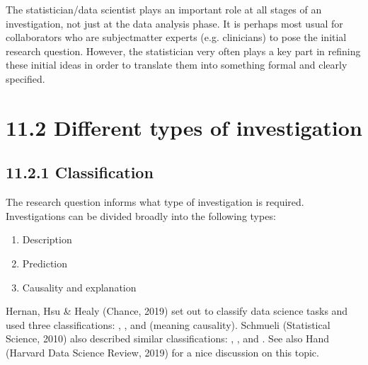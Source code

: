 \documentclass[letterpaper,10pt,english]{jupyterBook}
\let\sphinxpxdimen\pdfpxdimen\else\newdimen\sphinxpxdimen
\begin{document}
\begin{figure}[htbp]
\centering

\noindent\sphinxincludegraphics[height=400\sphinxpxdimen]{{01_intro_PPDAC_adapt}.png}
\end{figure}

\sphinxAtStartPar
The statistician/data scientist plays an important role at all stages of an investigation, not just at
the data analysis phase. It is perhaps most usual for collaborators who are subject\sphinxhyphen{}matter experts
(e.g. clinicians) to pose the initial research question. However, the statistician very often plays a
key part in refining these initial ideas in order to translate them into something formal and clearly
specified.


\section{11.2 Different types of investigation}
\label{\detokenize{11.c. Types of Investigation:different-types-of-investigation}}\label{\detokenize{11.c. Types of Investigation::doc}}

\subsection{11.2.1 Classification}
\label{\detokenize{11.c. Types of Investigation:classification}}
\sphinxAtStartPar
The research question informs what type of investigation is required. Investigations can be divided
broadly into the following types:
\begin{enumerate}
%
\item {} 
\sphinxAtStartPar
Description

\item {} 
\sphinxAtStartPar
Prediction

\item {} 
\sphinxAtStartPar
Causality and explanation

\end{enumerate}

\sphinxAtStartPar
Hernan, Hsu \& Healy (Chance, 2019) set out to classify data science tasks and used three classifications: , , and  (meaning causality). Schmueli (Statistical Science, 2010) also described similar classifications: , , and . See also Hand (Harvard Data Science Review, 2019) for a nice discussion on this topic.
\end{document}

